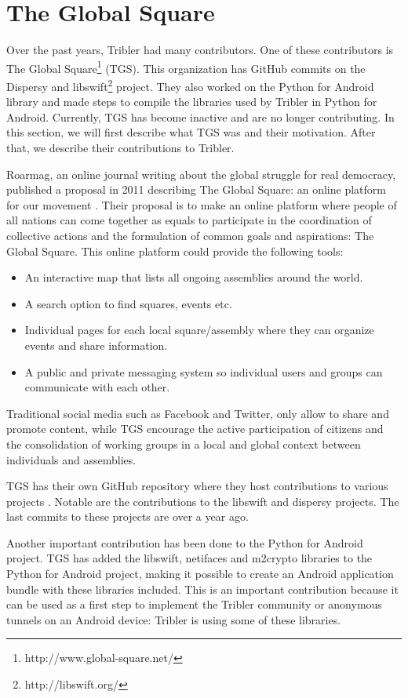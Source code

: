\section{The Global Square}
	\label{sec:tgs}
	Over the past years, Tribler had many contributors. One of these contributors is The Global Square\footnote{http://www.global-square.net/} (TGS). This organization has GitHub commits on the Dispersy and libswift\footnote{http://libswift.org/} project. They also worked on the Python for Android library and made steps to compile the libraries used by Tribler in Python for Android. Currently, TGS has become inactive and are no longer contributing. In this section, we will first describe what TGS was and their motivation. After that, we describe their contributions to Tribler.

	Roarmag, an online journal writing about the global struggle for real democracy, published a proposal in 2011 describing The Global Square: an online platform for our movement \cite{theglobalsquare}. Their proposal is to make an online platform where people of all nations can come together as equals to participate in the coordination of collective actions and the formulation of common goals and aspirations: The Global Square. This online platform could provide the following tools:
	\begin{itemize}
		\item An interactive map that lists all ongoing assemblies around the world.
		\item A search option to find squares, events etc.
		\item Individual pages for each local square/assembly where they can organize events and share information.
		\item A public and private messaging system so individual users and groups can communicate with each other.
	\end{itemize}
	Traditional social media such as Facebook and Twitter, only allow to share and promote content, while TGS encourage the active participation of citizens and the consolidation of working groups in a local and global context between individuals and assemblies.
	
	TGS has their own GitHub repository where they host contributions to various projects \cite{theglobalsquaregithub}. Notable are the contributions to the libswift and dispersy projects. The last commits to these projects are over a year ago.
		
	Another important contribution has been done to the Python for Android project. TGS has added the libswift, netifaces and m2crypto libraries to the Python for Android project, making it possible to create an Android application bundle with these libraries included. This is an important contribution because it can be used as a first step to implement the Tribler community or anonymous tunnels on an Android device: Tribler is using some of these libraries.

